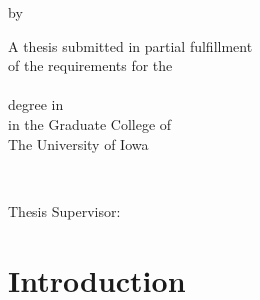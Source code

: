 \documentclass[11pt,notitlepage]{report}
\author{Samuel Foreman}
\title{\MakeUppercase{\normalsize\mytitle}\vspace{-2em}}
\author{\vspace{-5ex}}
\date{\vspace{-5ex}}
\begin{document}
\maketitle

\thispagestyle{empty}
\bigvertspace%
\begin{tightcenter}
    by
\end{tightcenter}
\mylinespacing%
\begin{tightcenter}
    \myname%
\end{tightcenter}
\longvertspacing%
\begin{tightcenter}
A thesis submitted in partial fulfillment \\
of the requirements for the \\
\mydegree~\\
degree in \myprogram~\\
in the Graduate College of \\
The University of Iowa
\end{tightcenter}
\mylinespacing%
\begin{tightcenter}
\mymonth~\myyear%
\end{tightcenter}
\mylinespacing%
\begin{tightcenter}
Thesis Supervisor: \myadvisor%
\end{tightcenter}
%
\newpage
\signaturepg%
% 

\setcounter{page}{2}
% 

% 









% 


\linespread{1.25}

\chapter{Introduction}%
\label{chap:introduction}

\end{document}
